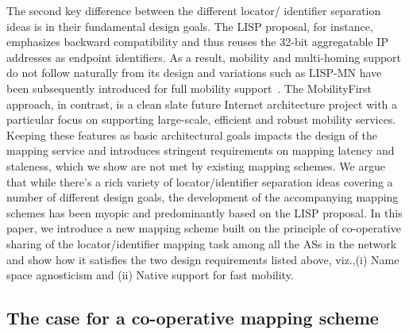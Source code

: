 The second key difference between the different locator/ identifier separation ideas is in their fundamental design goals. The LISP proposal, for instance, emphasizes backward compatibility and thus reuses the 32-bit aggregatable IP addresses as endpoint identifiers. As a result, mobility and multi-homing support do not follow naturally from its design and variations such as LISP-MN have been subsequently introduced for full mobility support~\cite{farinacci-mn}. The MobilityFirst approach, in contrast, is a clean slate future Internet architecture project with a particular focus on supporting large-scale, efficient and robust mobility services. Keeping these features as basic architectural goals impacts the design of the mapping service and introduces stringent requirements on mapping latency and staleness, which we show are not met by existing mapping schemes. We argue that while there's a rich variety of locator/identifier separation ideas covering a number of different design goals, the development of the accompanying mapping schemes has been myopic and predominantly based on the LISP proposal. In this paper, we introduce a new mapping scheme built on the principle of co-operative sharing of the locator/identifier mapping task among all the ASs in the network and show how it satisfies the two design requirements listed above, viz.,(i) Name space agnosticism and (ii) Native support for fast mobility. 

\subsection{The case for a co-operative mapping scheme}

